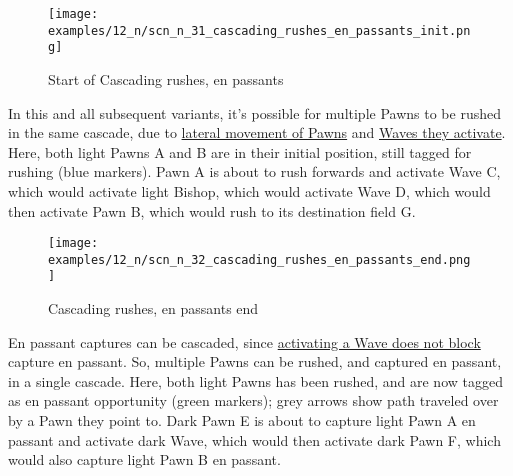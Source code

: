 \vspace*{-1.4\baselineskip}
\noindent
\begin{figure}[!h]
\texttt{[image: examples/12\_n/scn\_n\_31\_cascading\_rushes\_en\_passants\_init.png]}
\vspace*{-1.4\baselineskip}
\caption{Start of Cascading rushes, en passants}
\label{fig:scn_n_31_cascading_rushes_en_passants_init}
\end{figure}

\vspace*{-0.5\baselineskip}
In this and all subsequent variants, it's possible for multiple Pawns to be rushed
in the same cascade, due to
\hyperref[fig:scn_n_16_sideways_pawn_init]{lateral movement of Pawns} and
\hyperref[fig:scn_n_17_sideways_pawn_activated_wave]{Waves they activate}.\newline
\indent
Here, both light Pawns A and B are in their initial position, still tagged for
rushing (blue markers). Pawn A is about to rush forwards and activate Wave C,
which would activate light Bishop, which would activate Wave D, which would then
activate Pawn B, which would rush to its destination field G.

\clearpage %

\vspace*{-2.1\baselineskip}
\noindent
\begin{figure}[!h]
\texttt{[image: examples/12\_n/scn\_n\_32\_cascading\_rushes\_en\_passants\_end.png]}
\vspace*{-1.4\baselineskip}
\caption{Cascading rushes, en passants end}
\label{fig:scn_n_32_cascading_rushes_en_passants_end}
\end{figure}

\vspace*{-0.5\baselineskip}
En passant captures can be cascaded, since
\hyperref[fig:scn_mv_091_activation_after_en_passant_end]{activating a Wave does not block}
capture en passant. So, multiple Pawns can be rushed, and captured en passant,
in a single cascade.\newline
\indent
Here, both light Pawns has been rushed, and are now tagged as en passant opportunity
(green markers); grey arrows show path traveled over by a Pawn they point to. Dark
Pawn E is about to capture light Pawn A en passant and activate dark Wave, which
would then activate dark Pawn F, which would also capture light Pawn B en passant.

